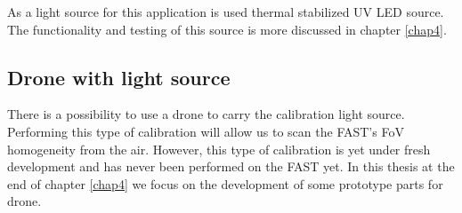 \par
As a light source for this application is used thermal stabilized UV LED source. The functionality and testing of this source is more discussed in chapter \ref{chap4}.


\subsection{Drone with light source}
There is a possibility to use a drone to carry the calibration light source. Performing this type of calibration will allow us to scan the FAST's FoV homogeneity from the air. However, this type of calibration is yet under fresh development and has never been performed on the FAST yet. In this thesis at the end of chapter \ref{chap4} we focus on the development of some prototype parts for drone.





